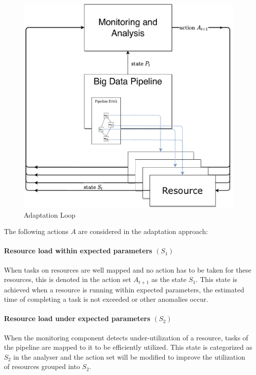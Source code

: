         \begin{figure}[h!]
            \centering
            \includegraphics[width=\columnwidth]{figures/monitoring_with_inner_resources.drawio.pdf}
            \caption{Adaptation Loop}
            \label{fig:adaptation-loop}
        \end{figure}
        The following actions $A$ are considered in the adaptation approach:

        \paragraph*{Resource load within expected parameters $(S_1)$} 
        When tasks on resources are well mapped and no action has to be taken for these resources, this is denoted in the action set $A_{t+1}$ as the state $S_1$. This state is achieved when a resource is running within expected parameters, the estimated time of completing a task is not exceeded or other anomalies occur.

        \paragraph*{Resource load under expected parameters $(S_2)$} 
        When the monitoring component detects under-utilization of a resource, tasks of the pipeline are mapped to it to be efficiently utilized. This state is categorized as $S_2$ in the analyser and the action set will be modified to improve the utilization of resources grouped into $S_2$. 


